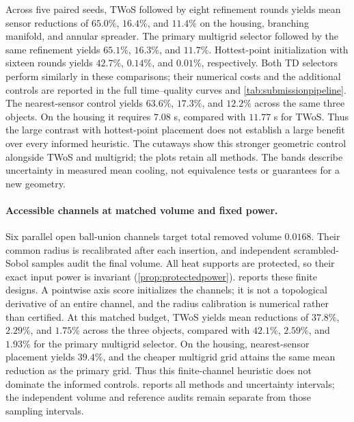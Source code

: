 Across five paired seeds, TWoS followed by eight refinement rounds yields
mean sensor reductions of $65.0\%$, $16.4\%$, and $11.4\%$ on the housing,
branching manifold, and annular spreader. The primary multigrid selector followed
by the same refinement yields $65.1\%$, $16.3\%$, and $11.7\%$.
Hottest-point initialization with sixteen rounds yields $42.7\%$, $0.14\%$,
and $0.01\%$, respectively. Both TD selectors perform similarly in these
comparisons; their numerical costs and the additional controls are reported
in the full time--quality curves and \cref{tab:submissionpipeline}.
The nearest-sensor control yields $63.6\%$, $17.3\%$, and $12.2\%$
across the same three objects. On the housing it requires $7.08$ s, compared
with $11.77$ s for TWoS.
Thus the large contrast with hottest-point placement does not establish a
large benefit over every informed heuristic. The cutaways show this stronger
geometric control alongside TWoS and multigrid; the plots retain all methods.
The bands describe uncertainty in measured mean cooling, not equivalence tests
or guarantees for a new geometry.


\paragraph{Accessible channels at matched volume and fixed power.}
Six parallel open ball-union channels target total removed volume $0.0168$.
Their common radius is recalibrated after each insertion, and independent
scrambled-Sobol samples audit the final volume. All heat supports are protected,
so their exact input power is invariant (\cref{prop:protectedpower}).
 reports these finite designs. A pointwise
axis score initializes the channels; it is not a topological derivative of
an entire channel, and the radius calibration is numerical rather than certified.
At this matched budget, TWoS yields mean reductions of $37.8\%$, $2.29\%$,
and $1.75\%$ across the three objects, compared with $42.1\%$, $2.59\%$,
and $1.93\%$ for the primary multigrid selector. On the housing, nearest-sensor
placement yields $39.4\%$, and the cheaper multigrid grid attains the same
mean reduction as the primary grid. Thus this finite-channel heuristic does
not dominate the informed controls.  reports all
methods and uncertainty intervals; the independent volume and reference audits
remain separate from those sampling intervals.

